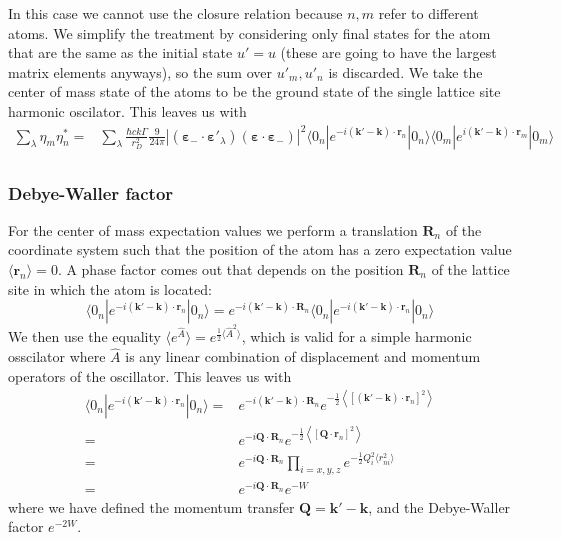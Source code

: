 \documentclass[11pt,letter]{article}
\newcommand{\bv}[1]{\ensuremath{\bm{#1}}}
\begin{document}
In this case we cannot use the closure relation because $n,m$ refer to
different atoms.   We simplify the treatment by considering only final states
for the atom that are the same as the initial state $u'=u$ (these are going to
have the largest matrix elements anyways), so the sum over $u'_{m},u'_{n}$ is
discarded.  We take the center of mass state of the atoms to be the
ground state of the single lattice site harmonic oscilator.  This leaves us
with 
\begin{equation}
\begin{split}
 \sum_{\lambda } \eta_{m}\eta_{n}^{*} = & 
 \sum_{\lambda } \frac{\hbar c k \Gamma}{r_{D}^{2}}  
    \frac{9}{24\pi} 
       | (\bv{\varepsilon}_{-}\cdot \bv{\varepsilon}'_{\lambda} )
                       (\bv{\varepsilon}\cdot \bv{\varepsilon}_{-} ) |^{2}
      \langle 0_{n} | e^{-i(\bv{k}'-\bv{k}) \cdot\bv{r}_{n}} | 0_{n}  \rangle
      \langle 0_{m} | e^{i(\bv{k}'-\bv{k}) \cdot\bv{r}_{m}} | 0_{m}  \rangle \\
\end{split}
\end{equation}

\subsubsection{Debye-Waller factor} 

For the center of mass expectation values we perform a translation $\bv{R}_{n}$ of the
coordinate system such that the position of the atom has a zero expectation
value $\langle \bv{r}_{n} \rangle = 0$.  A phase factor comes out that depends
on the position $\bv{R}_{n}$ of the lattice site in which the atom is located:
\begin{equation}
      \langle 0_{n} | e^{-i(\bv{k}'-\bv{k}) \cdot\bv{r}_{n}} | 0_{n}  \rangle 
    = e^{-i(\bv{k}'-\bv{k}) \cdot\bv{R}_{n}} 
      \langle 0_{n} | e^{-i(\bv{k}'-\bv{k}) \cdot\bv{r}_{n}} | 0_{n}  \rangle
\end{equation} 
We then use the equality $\langle e^{\hat{A}} \rangle = e^{\frac{1}{2} \langle \hat{A}^{2} \rangle }$, 
which is valid for a simple harmonic osscilator where $\hat{A}$ is any linear
combination of displacement and momentum operators of the oscillator.  This leaves us with
\begin{equation}
\begin{split}
      \langle 0_{n} | e^{-i(\bv{k}'-\bv{k}) \cdot\bv{r}_{n}} | 0_{n}  \rangle 
    = & e^{-i(\bv{k}'-\bv{k}) \cdot\bv{R}_{n}} 
      e^{ -\frac{1}{2} \left\langle [ (\bv{k}'-\bv{k}) \cdot\bv{r}_{n} ]^{2} \right\rangle } \\
    = & e^{ -i \bv{Q} \cdot \bv{R}_{n}} 
      e^{ -\frac{1}{2} \left\langle [ \bv{Q} \cdot\bv{r}_{n} ]^{2} \right\rangle } \\ 
    = & e^{ -i \bv{Q} \cdot \bv{R}_{n}}
      \prod_{i=x,y,z} e^{ - \frac{1}{2}Q_{i}^{2}\langle r_{ni} ^{2} \rangle } \\ 
    = & e^{ -i \bv{Q} \cdot \bv{R}_{n}}
      e^{-W} 
\end{split}
\end{equation} 
where we have defined the momentum transfer $\bv{Q} = \bv{k}' - \bv{k}$,  and the Debye-Waller factor $e^{-2W}$. 
\end{document}
